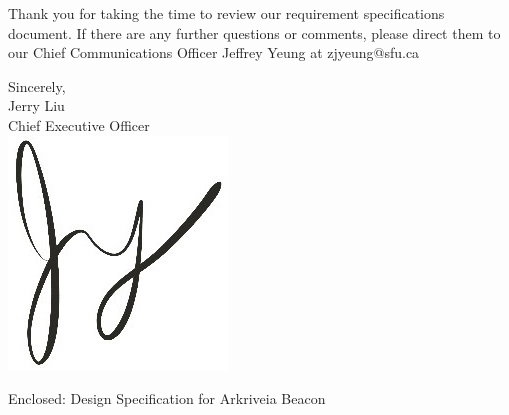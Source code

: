 \documentclass[11pt]{letter}
\begin{document}
\begin{letter}
\medskip
Thank you for taking the time to review our requirement specifications document. If there are any
further questions or comments, please direct them to our Chief Communications Officer Jeffrey Yeung
at zjyeung@sfu.ca
 
\medskip
Sincerely,\\
Jerry Liu\\
Chief Executive Officer\\

\vspace*{-0.25cm}
\includegraphics[scale=0.8]{./images/signature.jpg}

{Enclosed: Design Specification for Arkriveia Beacon}

\end{letter}
\end{document}
